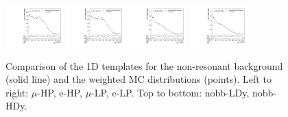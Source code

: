 \begin{figure}[htbp]
  \includegraphics[width=0.2\textwidth]{fig/2Dfit/templateVsReco_nonRes_r0_MJ_mu_HP_nobb_HDy.pdf}
  \includegraphics[width=0.2\textwidth]{fig/2Dfit/templateVsReco_nonRes_r0_MJ_e_HP_nobb_HDy.pdf}
  \includegraphics[width=0.2\textwidth]{fig/2Dfit/templateVsReco_nonRes_r0_MJ_mu_LP_nobb_HDy.pdf}
  \includegraphics[width=0.2\textwidth]{fig/2Dfit/templateVsReco_nonRes_r0_MJ_e_LP_nobb_HDy.pdf}\\
  \caption{
    Comparison of the 1D \MJ templates for the non-resonant background (solid line) and the weighted MC distributions (points).
    Left to right: $\mu$-HP, e-HP, $\mu$-LP, e-LP.
    Top to bottom: nobb-LDy, nobb-HDy.
  }
  \label{fig:1dtemplateVsReco_nonRes_MJ_Run2}
\end{figure}

